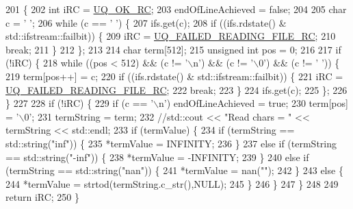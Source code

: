 \begin{DoxyCode}
201 \{
202   \textcolor{keywordtype}{int} iRC = \hyperlink{namespace_q_u_e_s_o_a8e909502900aecf24cedba022ea84471}{UQ\_OK\_RC};
203   endOfLineAchieved = \textcolor{keyword}{false};
204 
205   \textcolor{keywordtype}{char} c = \textcolor{charliteral}{' '};
206   \textcolor{keywordflow}{while} (c == \textcolor{charliteral}{' '}) \{
207     ifs.get(c);
208     \textcolor{keywordflow}{if} ((ifs.rdstate() & std::ifstream::failbit)) \{
209       iRC = \hyperlink{namespace_q_u_e_s_o_ab2cce05a6208cb239ef640a4ba6e5327}{UQ\_FAILED\_READING\_FILE\_RC};
210       \textcolor{keywordflow}{break};
211     \}
212   \};
213 
214   \textcolor{keywordtype}{char} term[512];
215   \textcolor{keywordtype}{unsigned} \textcolor{keywordtype}{int} pos = 0;
216 
217   \textcolor{keywordflow}{if} (!iRC) \{
218     \textcolor{keywordflow}{while} ((pos < 512) && (c != \textcolor{charliteral}{'\(\backslash\)n'}) && (c != \textcolor{charliteral}{'\(\backslash\)0'}) && (c != \textcolor{charliteral}{' '})) \{
219       term[pos++] = c;
220       \textcolor{keywordflow}{if} ((ifs.rdstate() & std::ifstream::failbit)) \{
221         iRC = \hyperlink{namespace_q_u_e_s_o_ab2cce05a6208cb239ef640a4ba6e5327}{UQ\_FAILED\_READING\_FILE\_RC};
222         \textcolor{keywordflow}{break};
223       \}
224       ifs.get(c);
225     \};
226   \}
227 
228   \textcolor{keywordflow}{if} (!iRC) \{
229     \textcolor{keywordflow}{if} (c == \textcolor{charliteral}{'\(\backslash\)n'}) endOfLineAchieved = \textcolor{keyword}{true};
230     term[pos] = \textcolor{charliteral}{'\(\backslash\)0'};
231     termString = term;
232     \textcolor{comment}{//std::cout << "Read chars = " << termString << std::endl;}
233     \textcolor{keywordflow}{if} (termValue) \{
234       \textcolor{keywordflow}{if} (termString == std::string(\textcolor{stringliteral}{"inf"})) \{
235         *termValue = INFINITY;
236       \}
237       \textcolor{keywordflow}{else} \textcolor{keywordflow}{if} (termString == std::string(\textcolor{stringliteral}{"-inf"})) \{
238         *termValue = -INFINITY;
239       \}
240       \textcolor{keywordflow}{else} \textcolor{keywordflow}{if} (termString == std::string(\textcolor{stringliteral}{"nan"})) \{
241         *termValue = nan(\textcolor{stringliteral}{""});
242       \}
243       \textcolor{keywordflow}{else} \{
244         *termValue = strtod(termString.c\_str(),NULL);
245       \}
246     \}
247   \}
248 
249   \textcolor{keywordflow}{return} iRC;
250 \}
\end{DoxyCode}
